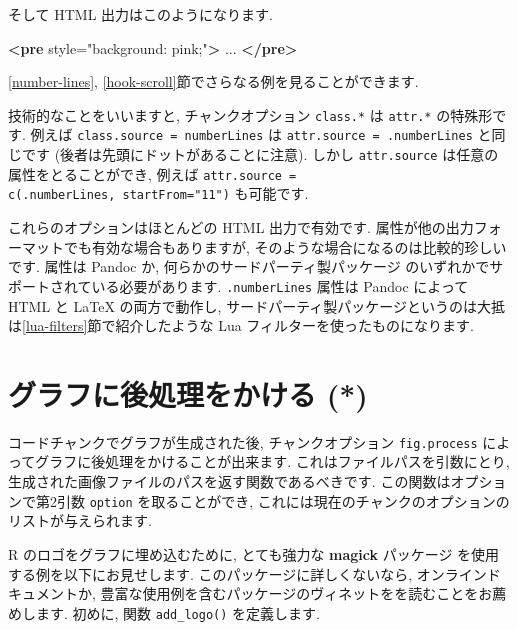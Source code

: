 \documentclass[
  11pt,
  lualatex,
  ja=standard]{bxjsreport}
\newenvironment{Shaded}{\begin{snugshade}}{\end{snugshade}}
\newcommand{\KeywordTok}[1]{\textcolor[rgb]{0.13,0.29,0.53}{\textbf{#1}}}
\newcommand{\NormalTok}[1]{#1}
\newcommand{\OtherTok}[1]{\textcolor[rgb]{0.56,0.35,0.01}{#1}}
\newcommand{\StringTok}[1]{\textcolor[rgb]{0.31,0.60,0.02}{#1}}
\begin{document}
そして HTML 出力はこのようになります.

\begin{Shaded}
\begin{Highlighting}[]
\KeywordTok{\textless{}pre}\OtherTok{ style=}\StringTok{"background: pink;"}\KeywordTok{\textgreater{}}
\NormalTok{...}
\KeywordTok{\textless{}/pre\textgreater{}}
\end{Highlighting}
\end{Shaded}

\ref{number-lines}, \ref{hook-scroll}節でさらなる例を見ることができます.

技術的なことをいいますと, チャンクオプション \texttt{class.*} は \texttt{attr.*} の特殊形です. 例えば \texttt{class.source = \textquotesingle{}numberLines\textquotesingle{}} は \texttt{attr.source = \textquotesingle{}.numberLines\textquotesingle{}} と同じです (後者は先頭にドットがあることに注意). しかし \texttt{attr.source} は任意の属性をとることができ, 例えば \texttt{attr.source = c(\textquotesingle{}.numberLines\textquotesingle{},\ \textquotesingle{}startFrom="11"\textquotesingle{})} も可能です.

これらのオプションはほとんどの HTML 出力で有効です. 属性が他の出力フォーマットでも有効な場合もありますが, そのような場合になるのは比較的珍しいです. 属性は Pandoc か, 何らかのサードパーティ製パッケージ のいずれかでサポートされている必要があります. \texttt{.numberLines} 属性は Pandoc によって HTML と LaTeX の両方で動作し, サードパーティ製パッケージというのは大抵は\ref{lua-filters}節で紹介したような Lua フィルターを使ったものになります.

\hypertarget{fig-process}{%
\section{グラフに後処理をかける (*)}\label{fig-process}}

コードチャンクでグラフが生成された後, チャンクオプション \texttt{fig.process} によってグラフに後処理をかけることが出来ます. これはファイルパスを引数にとり, 生成された画像ファイルのパスを返す関数であるべきです. この関数はオプションで第2引数 \texttt{option} を取ることができ, これには現在のチャンクのオプションのリストが与えられます.

R のロゴをグラフに埋め込むために, とても強力な \textbf{magick} パッケージ \autocite{R-magick} を使用する例を以下にお見せします. このパッケージに詳しくないなら, オンラインドキュメントか, 豊富な使用例を含むパッケージのヴィネットをを読むことをお薦めします. 初めに, 関数 \texttt{add\_logo()} を定義します.
\end{document}
